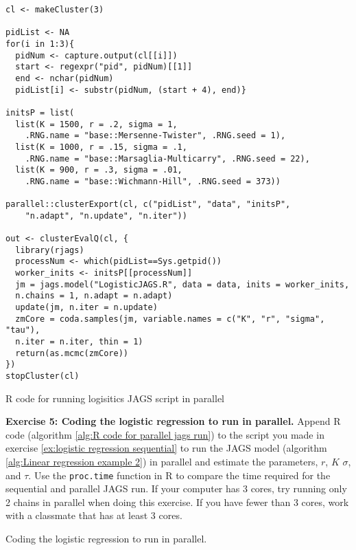 \documentclass[12pt,english]{article}
\begin{document}
\begin{algorithm}
\begin{Verbatim}[frame=single]
cl <- makeCluster(3)

pidList <- NA
for(i in 1:3){
  pidNum <- capture.output(cl[[i]])
  start <- regexpr("pid", pidNum)[[1]]
  end <- nchar(pidNum)
  pidList[i] <- substr(pidNum, (start + 4), end)}

initsP = list(
  list(K = 1500, r = .2, sigma = 1, 
  	.RNG.name = "base::Mersenne-Twister", .RNG.seed = 1),
  list(K = 1000, r = .15, sigma = .1,
  	.RNG.name = "base::Marsaglia-Multicarry", .RNG.seed = 22),
  list(K = 900, r = .3, sigma = .01,
  	.RNG.name = "base::Wichmann-Hill", .RNG.seed = 373))

parallel::clusterExport(cl, c("pidList", "data", "initsP", 
	"n.adapt", "n.update", "n.iter"))

out <- clusterEvalQ(cl, {
  library(rjags)
  processNum <- which(pidList==Sys.getpid())
  worker_inits <- initsP[[processNum]]
  jm = jags.model("LogisticJAGS.R", data = data, inits = worker_inits, 
  n.chains = 1, n.adapt = n.adapt)
  update(jm, n.iter = n.update)
  zmCore = coda.samples(jm, variable.names = c("K", "r", "sigma", "tau"), 
  n.iter = n.iter, thin = 1)
  return(as.mcmc(zmCore))
}) 
stopCluster(cl)
\end{Verbatim}
\caption{R code for running logisitics JAGS script in parallel}
\label{alg:R code for parallel jags run}
\end{algorithm}

\belowcaptionskip=-40pt
\begin{exercise}
\begin{mdframed}
\doublespacing
\textbf{Exercise 5: Coding the logistic regression to run in parallel.}  Append R code (algorithm \ref{alg:R code for parallel jags run}) to the script you made in exercise \ref{ex:logistic regression sequential} to run the JAGS model (algorithm \ref{alg:Linear regression example 2}) in parallel and estimate the parameters, $r$, $K$ $\sigma$, and $\tau$. Use the \texttt{proc.time} function in R to compare the time required for the sequential and parallel JAGS run. If your computer has 3 cores, try running only 2 chains in parallel when doing this exercise. If you have fewer than 3 cores, work with a classmate that has at least 3 cores.
\end{mdframed}
\captionsetup{textformat=empty, labelformat=empty}
\caption[Coding the logistic regression to run in parallel]{Coding the logistic regression to run in parallel.}
\label{ex:logistic regression parallel}
\end{exercise}
\belowcaptionskip=0pt
\end{document}
